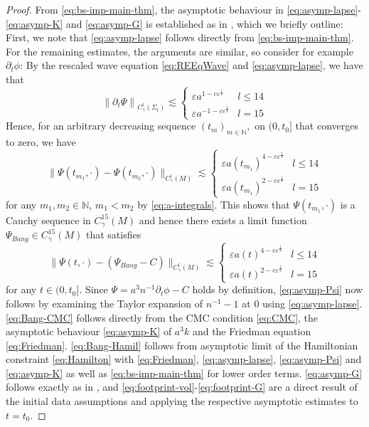 \documentclass[11pt,leqno,textwidth=10cm]{amsart}
\numberwithin{equation}{section}
\theoremstyle{definition}
\theoremstyle{plain}
\newcommand{\1}{\mathbbm{1}}
\newcommand{\N}{\mathbb{N}}
\renewcommand{\epsilon}{\varepsilon}
\newcommand{\del}{\partial}
\begin{document}
\begin{proof}
From \eqref{eq:bs-imp-main-thm}, the asymptotic behaviour in \eqref{eq:asymp-lapse}-\eqref{eq:asymp-K} and \eqref{eq:asymp-G} is established as in \cite[Theorem 15.1]{Rodnianski2014}, which we briefly outline: First, we note that \eqref{eq:asymp-lapse} follows directly from \eqref{eq:bs-imp-main-thm}. For the remaining estimates, the arguments are similar, so consider for example $\del_t\phi$: By the rescaled wave equation \eqref{eq:REEqWave} and \eqref{eq:asymp-lapse}, we have that
\begin{equation*}
\left\|\del_t\Psi\right\|_{C^l_\gamma(\Sigma_t)}\lesssim\begin{cases}
\epsilon a^{1-c\epsilon^\frac18} & l\leq 14\\
\epsilon a^{-1-c\epsilon^\frac18} & l=15
\end{cases}
\end{equation*}
Hence, for an arbitrary decreasing sequence $(t_m)_{m\in\N},$ on $(0,t_0]$ that converges to zero, we have
\[\|\Psi(t_{m_1},\cdot)-\Psi(t_{m_2},\cdot)\|_{C^l_\gamma(M)}\lesssim\begin{cases}
\epsilon a(t_{m_1})^{4-c\epsilon^\frac18} & l\leq 14\\
\epsilon a(t_{m_1})^{2-c\epsilon^\frac18} & l=15
\end{cases}\]
for any $m_1,m_2\in\N,\,m_1<m_2$ by \eqref{eq:a-integrals}. This shows that $\Psi(t_{m_1},\cdot)$ is a Cauchy sequence in $C_\gamma^{15}(M)$ and hence there exists a limit function ${\Psi}_{Bang}\in C_\gamma^{15}(M)$ that satisfies
\[\|\Psi(t,\cdot)-({\Psi}_{Bang}-C)\|_{C^l_\gamma(M)}\lesssim\begin{cases}
\epsilon a(t)^{4-c\epsilon^\frac18} & l\leq 14\\
\epsilon a(t)^{2-c\epsilon^\frac18} & l=15
\end{cases}\]
for any $t\in(0,t_0]$. Since $\Psi=a^3n^{-1}\del_t\phi-C$ holds by definition, \eqref{eq:asymp-Psi} now follows by examining the Taylor expansion of $n^{-1}-1$ at $0$ using \eqref{eq:asymp-lapse}.\\

\noindent \eqref{eq:Bang-CMC} follows directly from the CMC condition \eqref{eq:CMC}, the asymptotic behaviour \eqref{eq:asymp-K} of $a^3k$ and the Friedman equation \eqref{eq:Friedman}. \eqref{eq:Bang-Hamil} follows from asymptotic limit of the Hamiltonian constraint \eqref{eq:Hamilton} with \eqref{eq:Friedman}, \eqref{eq:asymp-lapse}, \eqref{eq:asymp-Psi} and \eqref{eq:asymp-K} as well as \eqref{eq:bs-imp-main-thm} for lower order terms. \eqref{eq:asymp-G} follows exactly as in \cite[Theorem 15.1]{Rodnianski2014}, and \eqref{eq:footprint-vol}-\eqref{eq:footprint-G} are a direct result of the initial data assumptions and applying the respective asymptotic estimates to $t=t_0$.


\end{proof}
\end{document}
